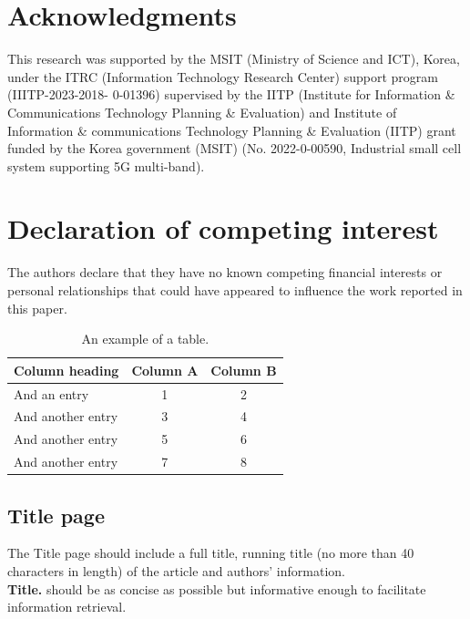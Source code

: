 \documentclass[final,3p,times,twocolumn]{elsarticle}
\begin{document}
\section*{Acknowledgments}
This research was supported by the MSIT (Ministry of Science and ICT), Korea, under the ITRC (Information Technology Research Center) support program (IIITP-2023-2018-
0-01396) supervised by the IITP (Institute for Information \& Communications Technology Planning \& Evaluation) and Institute of Information \& communications Technology Planning \& Evaluation (IITP) grant funded by the Korea government (MSIT) (No. 2022-0-00590, Industrial small cell system supporting 5G multi-band).

\section*{Declaration of competing interest}
The authors declare that they have no known competing financial interests or personal relationships that could have appeared to influence the work reported in this paper.

\begin{table}[]
\centering
\caption{An example of a table.}
\begin{tabular}{@{}lcc@{}}
\toprule
Column heading & Column A & Column B \\ \midrule
And an entry                   & 1        & 2        \\
And another entry              & 3        & 4        \\
And another entry              & 5        & 6        \\
And another entry              & 7        & 8        \\ \bottomrule
\end{tabular}
\label{tab:ex}
\end{table}

\subsection{Title page}

The Title page should include a full title, running title (no more than 40 characters in length) of the article and authors' information. \\

\textbf{Title. }should be as concise as possible but informative enough to facilitate information retrieval.\\
\end{document}
